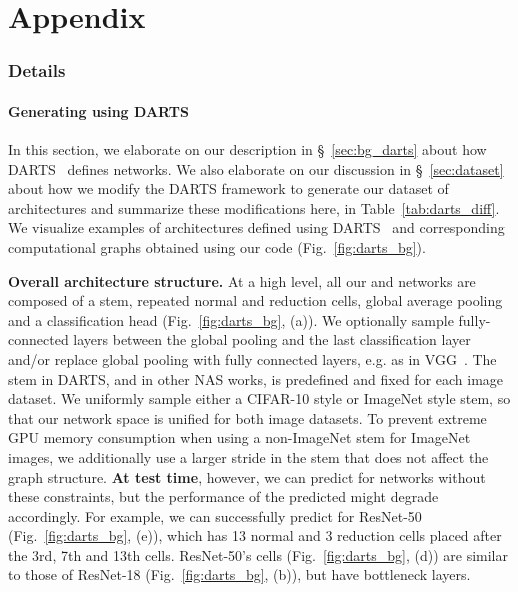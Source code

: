 \appendix
\setlength\cftbeforesubsecskip{-1pt}
\renewcommand\cftsecafterpnum{\vskip0pt}

\part{Appendix}\label{sec:apdx}

\vspace{-10pt}
\begin{spacing}{0.2}
	\parttoc \end{spacing}


\vspace{-3pt}
\section{\dataset Details \label{apdx:dataset}}
\vspace{-5pt}

\subsection{Generating \dataset using DARTS\label{apdx:darts_bg}}
\vspace{-3pt}

In this section, we elaborate on our description in \S~\ref{sec:bg_darts} about how DARTS~\cite{liu2018darts} defines networks. We also elaborate on our discussion in \S~\ref{sec:dataset} about how we modify the DARTS framework to generate our \dataset dataset of architectures and summarize these modifications here, in Table~\ref{tab:darts_diff}.
We visualize examples of architectures defined using DARTS~\cite{liu2018darts} and corresponding computational graphs obtained using our code (Fig.~\ref{fig:darts_bg}). 

\textbf{Overall architecture structure.} At a high level, all our \iid and \ood networks are composed of a stem, repeated normal and reduction cells, global average pooling and a classification head (Fig.~\ref{fig:darts_bg}, (a)). We optionally sample fully-connected layers between the global pooling and the last classification layer and/or replace global pooling with fully connected layers, e.g. as in VGG~\cite{simonyan2014very}. The stem in DARTS, and in other NAS works, is predefined and fixed for each image dataset. We uniformly sample either a CIFAR-10 style or ImageNet style stem, so that our network space is unified for both image datasets. To prevent extreme GPU memory consumption when using a non-ImageNet stem for ImageNet images, we additionally use a larger stride in the stem that does not affect the graph structure.
\textbf{At test time}, however, we can predict \params for networks without these constraints, but the performance of the predicted \params might degrade accordingly. For example, we can successfully predict \params for ResNet-50 (Fig.~\ref{fig:darts_bg}, (e)), which has 13 normal and 3 reduction cells placed after the 3rd, 7th and 13th cells. ResNet-50's cells (Fig.~\ref{fig:darts_bg}, (d)) are similar to those of ResNet-18 (Fig.~\ref{fig:darts_bg}, (b)), but have  bottleneck layers.

